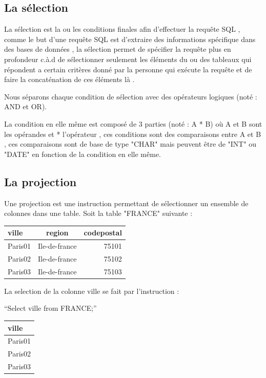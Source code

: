 \documentclass[oneside,13pt,a4paper]{report}
\begin{document}
        \subsection{La sélection}

            La sélection est la ou les conditions finales afin d'effectuer la requête SQL , comme le but d'une requête SQL est d'extraire des informations spécifique dans des bases de données , la sélection permet de spécifier la requête plus en profondeur c.à.d de sélectionner seulement les éléments du ou des tableaux qui répondent a certain critères donné par la personne qui exécute la requête et de faire la concaténation de ces éléments là .

    	    Nous séparons chaque condition de sélection avec des opérateurs logiques (noté : AND et OR).

	        La condition en elle même est composé de 3 parties (noté : A * B) où A et B sont les opérandes et * l'opérateur , ces conditions sont des comparaisons entre A et B , ces comparaisons sont de base de type "CHAR" mais peuvent être de "INT" ou "DATE" en fonction de la condition en elle même.

        \subsection{La projection}

         Une projection est une instruction permettant de sélectionner un ensemble de colonnes dans une table.
         Soit la table "FRANCE" suivante :



         \begin{tabular}{|l|c|r|}
          \hline
          ville & region & codepostal
          \\
          \hline
          Paris01 & Ile-de-france & 75101 \\
          Paris02 & Ile-de-france & 75102 \\
          Paris03 & Ile-de-france & 75103 \\
          \hline

         \end{tabular}


         La selection de la colonne ville se fait par l'instruction :

         \enquote{Select ville from FRANCE;}

         

         \begin{tabular}{|l|}
          \hline
          ville
          \\
          \hline
          Paris01 \\
          Paris02 \\
          Paris03  \\
          \hline


         \end{tabular}
\end{document}

